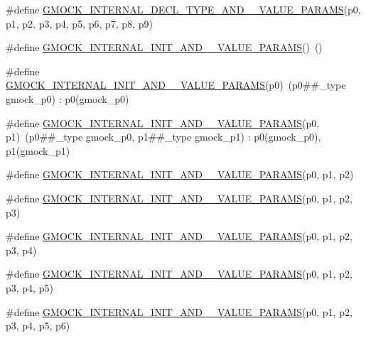 \begin{DoxyCompactItemize}
\item 
\#define \hyperlink{gmock-generated-actions_8h_a791e16a318652e43abb3c1aeba969d4d}{G\+M\+O\+C\+K\+\_\+\+I\+N\+T\+E\+R\+N\+A\+L\+\_\+\+D\+E\+C\+L\+\_\+\+T\+Y\+P\+E\+\_\+\+A\+N\+D\+\_\+\_\+\+V\+A\+L\+U\+E\+\_\+\+P\+A\+R\+A\+MS}(p0,  p1,  p2,  p3,  p4,  p5,  p6,  p7,  p8,  p9)
\item 
\#define \hyperlink{gmock-generated-actions_8h_aea5ee581daf40874ee7777e3c2b6d4ff}{G\+M\+O\+C\+K\+\_\+\+I\+N\+T\+E\+R\+N\+A\+L\+\_\+\+I\+N\+I\+T\+\_\+\+A\+N\+D\+\_\+\_\+\+V\+A\+L\+U\+E\+\_\+\+P\+A\+R\+A\+MS}()~()
\item 
\#define \hyperlink{gmock-generated-actions_8h_ad9d6ae16782bf5b8ffa096356f20b5ef}{G\+M\+O\+C\+K\+\_\+\+I\+N\+T\+E\+R\+N\+A\+L\+\_\+\+I\+N\+I\+T\+\_\+\+A\+N\+D\+\_\+\_\+\+V\+A\+L\+U\+E\+\_\+\+P\+A\+R\+A\+MS}(p0)~(p0\#\#\+\_\+type gmock\+\_\+p0) \+: p0(gmock\+\_\+p0)
\item 
\#define \hyperlink{gmock-generated-actions_8h_af8fc781d28282b09de4b5bda9563cded}{G\+M\+O\+C\+K\+\_\+\+I\+N\+T\+E\+R\+N\+A\+L\+\_\+\+I\+N\+I\+T\+\_\+\+A\+N\+D\+\_\+\_\+\+V\+A\+L\+U\+E\+\_\+\+P\+A\+R\+A\+MS}(p0,  p1)~(p0\#\#\+\_\+type gmock\+\_\+p0, p1\#\#\+\_\+type gmock\+\_\+p1) \+: p0(gmock\+\_\+p0), p1(gmock\+\_\+p1)
\item 
\#define \hyperlink{gmock-generated-actions_8h_ab452cc97981b64f68df83aedc023a201}{G\+M\+O\+C\+K\+\_\+\+I\+N\+T\+E\+R\+N\+A\+L\+\_\+\+I\+N\+I\+T\+\_\+\+A\+N\+D\+\_\+\_\+\+V\+A\+L\+U\+E\+\_\+\+P\+A\+R\+A\+MS}(p0,  p1,  p2)
\item 
\#define \hyperlink{gmock-generated-actions_8h_a9749c8366b3617ee3d14f4f4e9ae18ae}{G\+M\+O\+C\+K\+\_\+\+I\+N\+T\+E\+R\+N\+A\+L\+\_\+\+I\+N\+I\+T\+\_\+\+A\+N\+D\+\_\+\_\+\+V\+A\+L\+U\+E\+\_\+\+P\+A\+R\+A\+MS}(p0,  p1,  p2,  p3)
\item 
\#define \hyperlink{gmock-generated-actions_8h_ab3c77cabbb94ae2e3a4f9fdbda784731}{G\+M\+O\+C\+K\+\_\+\+I\+N\+T\+E\+R\+N\+A\+L\+\_\+\+I\+N\+I\+T\+\_\+\+A\+N\+D\+\_\+\_\+\+V\+A\+L\+U\+E\+\_\+\+P\+A\+R\+A\+MS}(p0,  p1,  p2,  p3,  p4)
\item 
\#define \hyperlink{gmock-generated-actions_8h_aef68add35463c75130872b22d07c43ff}{G\+M\+O\+C\+K\+\_\+\+I\+N\+T\+E\+R\+N\+A\+L\+\_\+\+I\+N\+I\+T\+\_\+\+A\+N\+D\+\_\+\_\+\+V\+A\+L\+U\+E\+\_\+\+P\+A\+R\+A\+MS}(p0,  p1,  p2,  p3,  p4,  p5)
\item 
\#define \hyperlink{gmock-generated-actions_8h_aa1ba027eec9b36d5e710bfe9da99d443}{G\+M\+O\+C\+K\+\_\+\+I\+N\+T\+E\+R\+N\+A\+L\+\_\+\+I\+N\+I\+T\+\_\+\+A\+N\+D\+\_\+\_\+\+V\+A\+L\+U\+E\+\_\+\+P\+A\+R\+A\+MS}(p0,  p1,  p2,  p3,  p4,  p5,  p6)

\end{DoxyCompactItemize}
